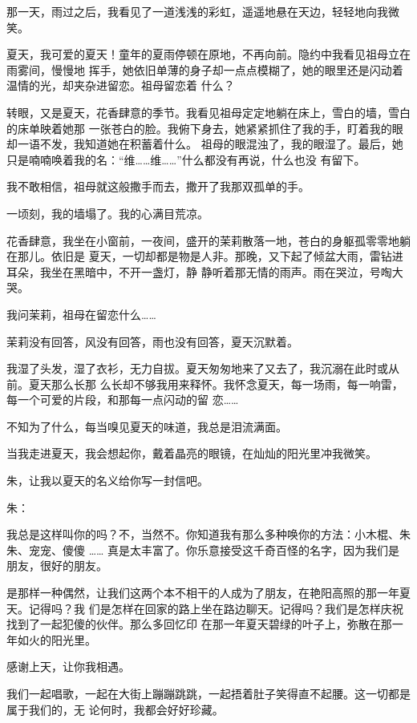 \documentclass[12pt,a4paper]{article}
\begin{document}
		那一天，雨过之后，我看见了一道浅浅的彩虹，遥遥地悬在天边，轻轻地向我微笑。

		夏天，我可爱的夏天！童年的夏雨停顿在原地，不再向前。隐约中我看见祖母立在雨雾间，慢慢地
	挥手，她依旧单薄的身子却一点点模糊了，她的眼里还是闪动着温情的光，却夹杂进留恋。祖母留恋着
	什么？

		转眼，又是夏天，花香肆意的季节。我看见祖母定定地躺在床上，雪白的墙，雪白的床单映着她那
	一张苍白的脸。我俯下身去，她紧紧抓住了我的手，盯着我的眼却一语不发，我知道她在积蓄着什么。
	祖母的眼混浊了，我的眼湿了。最后，她只是喃喃唤着我的名：“维……维……”什么都没有再说，什么也没
	有留下。

		我不敢相信，祖母就这般撒手而去，撒开了我那双孤单的手。

		一顷刻，我的墙塌了。我的心满目荒凉。

		花香肆意，我坐在小窗前，一夜间，盛开的茉莉散落一地，苍白的身躯孤零零地躺在那儿。依旧是
	夏天，一切却都是物是人非。那晚，又下起了倾盆大雨，雷钻进耳朵，我坐在黑暗中，不开一盏灯，静
	静听着那无情的雨声。雨在哭泣，号啕大哭。

		我问茉莉，祖母在留恋什么……

		茉莉没有回答，风没有回答，雨也没有回答，夏天沉默着。

		我湿了头发，湿了衣衫，无力自拔。夏天匆匆地来了又去了，我沉溺在此时或从前。夏天那么长那
	么长却不够我用来释怀。我怀念夏天，每一场雨，每一响雷，每一个可爱的片段，和那每一点闪动的留
	恋……

		不知为了什么，每当嗅见夏天的味道，我总是泪流满面。

	\endwriting



		当我走进夏天，我会想起你，戴着晶亮的眼镜，在灿灿的阳光里冲我微笑。

		朱，让我以夏天的名义给你写一封信吧。

		朱：

		我总是这样叫你的吗？不，当然不。你知道我有那么多种唤你的方法：小木棍、朱朱、宠宠、傻傻
	…… 真是太丰富了。你乐意接受这千奇百怪的名字，因为我们是朋友，很好的朋友。

		是那样一种偶然，让我们这两个本不相干的人成为了朋友，在艳阳高照的那一年夏天。记得吗？我
	们是怎样在回家的路上坐在路边聊天。记得吗？我们是怎样庆祝找到了一起犯傻的伙伴。那么多回忆印
	在那一年夏天碧绿的叶子上，弥散在那一年如火的阳光里。

		感谢上天，让你我相遇。

		我们一起唱歌，一起在大街上蹦蹦跳跳，一起捂着肚子笑得直不起腰。这一切都是属于我们的，无
	论何时，我都会好好珍藏。
\end{document}
